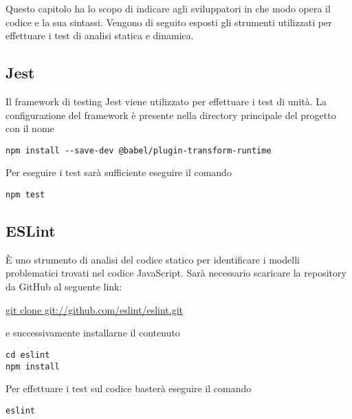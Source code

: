 \documentclass[../manuale_sviluppatore.tex]{subfiles}
\begin{document}
Questo capitolo ha lo scopo di indicare agli sviluppatori in che modo opera il codice e la sua sintassi. 
Vengono di seguito esposti gli strumenti utilizzati per effettuare i test di analisi statica e dinamica.

\subsection{Jest}
Il framework di testing Jest viene utilizzato per effettuare i test di unità. La configurazione del framework è presente nella directory principale del progetto con il nome \\
\begin{center}
    \verb|npm install --save-dev @babel/plugin-transform-runtime|
\end{center}

Per eseguire i test sarà sufficiente eseguire il comando \\
\begin{center}
\verb|npm test|
\end{center}

\subsection{ESLint}
È uno strumento di analisi del codice statico per identificare i modelli problematici trovati nel codice JavaScript.
Sarà necessario scaricare la repository da GitHub al seguente link: 
\begin{center} \url{git clone git://github.com/eslint/eslint.git} \end{center}
e successivamente installarne il contenuto
\begin{center}
    \verb|cd eslint| \\
    \verb|npm install|
\end{center}

Per effettuare i test sul codice basterà eseguire il comando
\begin{center} \verb|eslint| \end{center}
\end{document}
